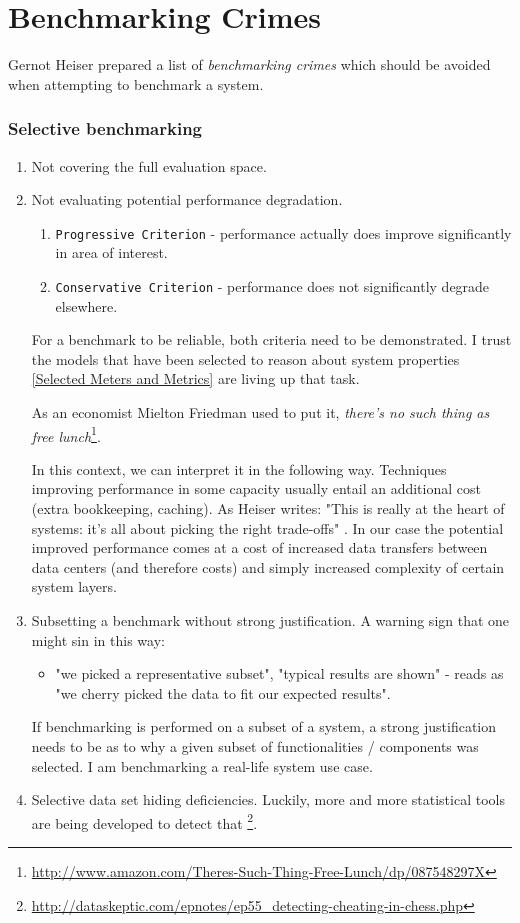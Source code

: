 \documentclass{uvamscse}
\begin{document}
\section{Benchmarking Crimes}

Gernot Heiser prepared a list \cite{GerHeiBench} of \textit{benchmarking crimes} which should be avoided when attempting to benchmark a system.

\subsubsection{Selective benchmarking}
\begin{enumerate}
  \item Not covering the full evaluation space.
  \item Not evaluating potential performance degradation.
    \begin{enumerate}
      \item \texttt{Progressive Criterion} - performance actually does improve significantly in area of interest.
      \item \texttt{Conservative Criterion} - performance does not significantly degrade elsewhere.
    \end{enumerate}
    For a benchmark to be reliable, both criteria need to be demonstrated. I trust the models that have been selected to reason about system properties \ref{Selected Meters and Metrics} are living up that task.

    As an economist Mielton Friedman used to put it, \textit{there's no such thing as free lunch}\footnote{\url{http://www.amazon.com/Theres-Such-Thing-Free-Lunch/dp/087548297X}}.

    In this context, we can interpret it in the following way. Techniques improving performance in some capacity usually entail an additional cost (extra bookkeeping, caching). As Heiser writes: "This is really at the heart of systems: it's all about picking the right trade-offs" \cite{GerHeiBench}. In our case the potential improved performance comes at a cost of increased data transfers between data centers (and therefore costs) and simply increased complexity of certain system layers.
  \item Subsetting a benchmark without strong justification. A warning sign that one might sin in this way:
    \begin{itemize}
      \item "we picked a representative subset", "typical results are shown" - reads as "we cherry picked the data to fit our expected results".
    \end{itemize}
    If benchmarking is performed on a subset of a system, a strong justification needs to be as to why a given subset of functionalities / components was selected. I am benchmarking a real-life system use case.
  \item Selective data set hiding deficiencies. Luckily, more and more statistical tools are being developed to detect that \footnote{\url{http://dataskeptic.com/epnotes/ep55_detecting-cheating-in-chess.php}}.
\end{enumerate}
\end{document}

